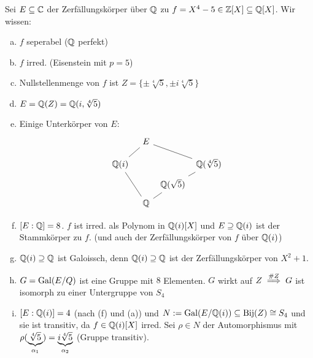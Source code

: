\documentclass[a4paper]{report}
\begin{document}
\begin{bsp}
  Sei $E \subseteq \mathbb{C}$ der Zerfällungskörper über $\mathbb{Q}$ zu $f = X^{4} - 5 \in \mathbb{Z}[X] \subseteq \mathbb{Q}[X]$. Wir wissen:
  \begin{enumerate}[(a)]
    \item $f$ seperabel ($\mathbb{Q}$ perfekt)
    \item $f$ irred. (Eisenstein mit $p=5$)
    \item Nullstellenmenge von $f$ ist $Z = \{\pm \sqrt[4] 5, \pm i\sqrt[4] 5\}$
    \item $E = \mathbb{Q}(Z) = \mathbb{Q}(i, \sqrt[4] 5)$
          \item Einige Unterkörper von $E$:
  \[\begin{tikzcd}[row sep= 5, column sep = 4]                                   &  & E                                                   &                                        &                                               \\
                                   &  &                                                     &                                        &                                               \\
\mathbb Q(i) \arrow[rruu, no head] &  &                                                     &                                        & {\mathbb Q(\sqrt[4] 5)} \arrow[lluu, no head] \\
                                   &  &                                                     & \mathbb Q(\sqrt 5) \arrow[ru, no head] &                                               \\
                                   &  & \mathbb Q \arrow[lluu, no head] \arrow[ru, no head] &                                        &
                                 \end{tikzcd}\]
    \item $[E:\mathbb{Q}] = 8$. $f$ ist irred. als Polynom in $\mathbb{Q}(i)[X]$ und $E \supseteq \mathbb{Q}(i)$ ist der Stammkörper zu $f$. (und auch der Zerfällungskörper von $f$ über $\mathbb{Q}(i)$)
    \item $\mathbb{Q}(i) \supseteq \mathbb{Q}$ ist Galoissch, denn $\mathbb{Q}(i) \supseteq \mathbb{Q}$ ist der Zerfällungskörper von $X^{2} + 1$.
    \item $G = \operatorname{Gal}(E/Q)$ ist eine Gruppe mit $8$ Elementen. $G$ wirkt auf $Z \overset{\#Z}{\implies} G$ ist isomorph zu einer Untergruppe von $S_{4}$
    \item $[E:\mathbb{Q}(i)] = 4$ (nach (f) und (a)) und $N:= \operatorname{Gal}(E/\mathbb{Q}(i)) \subseteq \operatorname{Bij}(Z) \cong S_{4}$ und sie ist transitiv, da $f \in \mathbb{Q}(i)[X]$ irred. Sei $\rho \in N$ der Automorphismus mit $\rho(\underbrace{\sqrt[4]5}_{\alpha_{1}}) = \underbrace{i\sqrt[4]5}_{\alpha_{2}}$ (Gruppe transitiv).

\end{enumerate}
\end{bsp}
\end{document}
